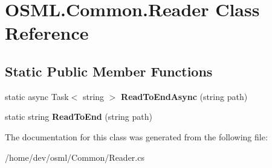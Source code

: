 \hypertarget{classOSML_1_1Common_1_1Reader}{}\section{O\+S\+M\+L.\+Common.\+Reader Class Reference}
\label{classOSML_1_1Common_1_1Reader}
\subsection*{Static Public Member Functions}
\begin{DoxyCompactItemize}
\item 
\mbox{\label{classOSML_1_1Common_1_1Reader_a210111073cac76e1871e8456e2eece49}} 
static async Task$<$ string $>$ {\bfseries Read\+To\+End\+Async} (string path)
\item 
\mbox{\label{classOSML_1_1Common_1_1Reader_a8c0427626e79a2aa165211c892c9c743}} 
static string {\bfseries Read\+To\+End} (string path)
\end{DoxyCompactItemize}


The documentation for this class was generated from the following file\+:\begin{DoxyCompactItemize}
\item 
/home/dev/osml/\+Common/Reader.\+cs\end{DoxyCompactItemize}
